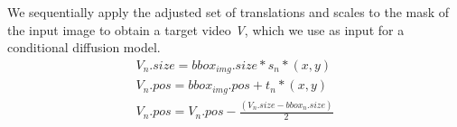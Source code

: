 We sequentially apply the adjusted set of translations and scales to the mask of the input image to obtain a target video \textit{V}, which we use as input for a conditional diffusion model\cite{2023videocomposer}.
\begin{equation}
    \begin{gathered}
        V_{n}.size = bbox_{img}.size*s_{n}*(x,y) \\
        V_{n}.pos = bbox_{img}.pos + t_{n}*(x,y) \\
        V_{n}.pos = V_{n}.pos - \frac{(V_{n}.size-bbox_{n}.size)}{2}
    \end{gathered}
\end{equation}
